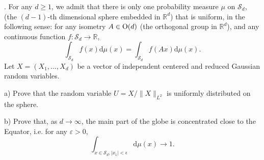 \documentclass[11pt,reqno]{amsart}
\newcommand{\RR}{{\mathbb R}}
\newcommand{\1}{\mathds{1}}
\newcommand{\rd}{{\mathrm{d}}}            %
\theoremstyle{definition}
\theoremstyle{remark}
\numberwithin{equation}{section}
\begin{document}
.
For any $d\geq 1$, we admit that there is only one probability measure $\mu$ on $\mathcal{S}_d$, 
(the $(d-1)$-th dimensional sphere embedded in $\RR^d$) that is uniform, in the following sense: for any isometry $A\in {\rm O}(d)$ (the orthogonal group in $\RR^d$), and any continuous function $f:\mathcal{S}_d\to\RR$,
$$
\int_{\mathcal{S}_d} f(x)\rd\mu(x)=\int_{\mathcal{S}_d} f(A x)\rd\mu(x).
$$
Let $X=(X_1,\dots,X_d)$ be a vector of independent centered and reduced Gaussian random variables.

a) Prove that the random variable $U=X/\|X\|_{L^2}$ is uniformly distributed on the sphere.

b) Prove that, as $d\to\infty$, the main part of the globe is concentrated close to the Equator,
i.e. for any $\varepsilon>0$,
$$
\int_{x\in\mathcal{S}_d,|x_1|<\epsilon} \rd\mu(x)\to 1.
$$
\end{document}
